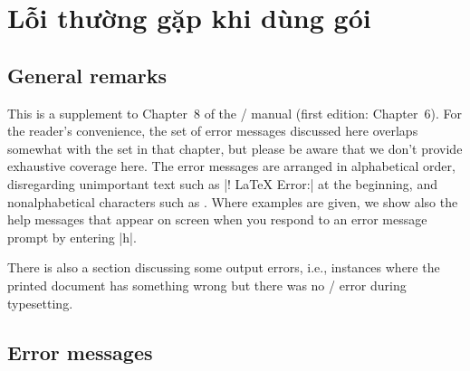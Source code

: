 \documentclass[11pt,leqno,titlepage,openany]{amsldoc}[1999/12/13]
\begin{document}
\chapter{Lỗi thường gặp khi dùng gói }

\section{General remarks}

This is a supplement to Chapter~8 of the \latex/ manual \cite{lamport} (first
edition: Chapter~6). For the reader's convenience, the set of error
messages discussed here overlaps somewhat with the set in that chapter,
but please be aware that we don't provide exhaustive coverage here.
The error messages are arranged in alphabetical order, disregarding
unimportant text such as |! LaTeX Error:| at the beginning, and
nonalphabetical characters such as \qc{\\}. Where examples are given, we
show also the help messages that appear on screen when you respond to an
error message prompt by entering |h|.

There is also a section discussing some output errors, i.e., instances
where the printed document has something wrong but there was no \latex/
error during typesetting.

\section{Error messages}

\end{document}

